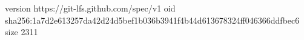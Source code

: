 version https://git-lfs.github.com/spec/v1
oid sha256:1a7d2e613257da42d24d5bef1b036b3941f4b44d613678324ff046366ddfbec6
size 2311

